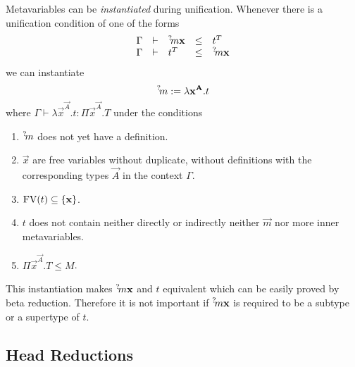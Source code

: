Metavariables can be \emph{instantiated} during unification. Whenever there is a
unification condition of one of the forms
$$
\begin{array}{lllll}
    \Gamma &\vdash &{{}^? \kern-0.2em m} {\mathbf x} &\le &t^T
    \\
    \Gamma &\vdash &t^T &\le &{{}^? \kern-0.2em m} {\mathbf x}
\end{array}
$$
we can instantiate
$$
    {{}^? \kern-0.2em m} := \lambda {\mathbf x} ^{{\mathbf A}}. t
$$
where $\Gamma \vdash \lambda \vec x^{\vec A}. t : \Pi \vec x^{\vec A}. T$ under
the conditions
\begin{enumerate}

    \item ${{}^? \kern-0.2em m}$ does not yet have a definition.

    \item $\vec x$ are free variables without duplicate, without definitions
        with the corresponding types $\vec A$ in the context $\Gamma$.

    \item $\text{FV}(t) \subseteq {\{{\mathbf x}\}}$.

    \item $t$ does not contain neither directly or indirectly neither $\vec m$
        nor more inner metavariables.

    \item $\Pi \vec x^{\vec A}. T \le M$.
\end{enumerate}

This instantiation makes ${{}^? \kern-0.2em m} {\mathbf x}$ and $t$ equivalent which can be easily
proved by beta reduction. Therefore it is not important if
${{}^? \kern-0.2em m} {\mathbf x}$ is required to be a subtype or a supertype of $t$.






\subsection{Head Reductions}

